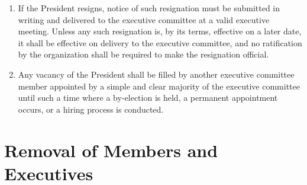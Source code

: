\documentclass[12pt]{article}
\begin{document}
\begin{enumerate}[{4}.1]
    \item	If the President resigns, notice of such resignation must be submitted in writing and delivered to the executive committee at a valid executive meeting. Unless any such resignation is, by its terms, effective on a later date, it shall be effective on delivery to the executive committee, and no ratification by the organization shall be required to make the resignation official.
    \item Any vacancy of the President shall be filled by another executive committee member appointed by a simple and clear majority of the executive committee until such a time where a by-election is held, a permanent appointment occurs, or a hiring process is conducted.
\end{enumerate}


\section{Removal of Members and Executives}
\end{document}
